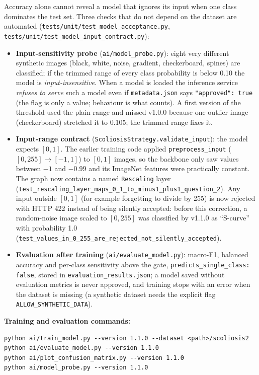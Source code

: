 \documentclass[12pt,a4paper]{article}
\newcommand{\fp}[1]{\nolinkurl{#1}}
\begin{document}
Accuracy alone cannot reveal a model that ignores its input when one class dominates the test set. Three checks that do not depend on the dataset are automated
(\fp{tests/unit/test_model_acceptance.py}, \fp{tests/unit/test_model_input_contract.py}):

\begin{itemize}[leftmargin=*]
    \item \textbf{Input-sensitivity probe} (\fp{ai/model_probe.py}): eight very different synthetic images (black, white, noise, gradient, checkerboard,
          spines) are classified; if the trimmed range of every class probability is below 0.10 the model is \emph{input-insensitive}. When a model is loaded the inference service
          \emph{refuses to serve} such a model even if \fp{metadata.json} says \texttt{"approved": true} (the flag is only a value; behaviour is what counts).
          A first version of the threshold used the plain range and missed v1.0.0 because one outlier image (checkerboard) stretched it to 0.105; the trimmed range fixes it.
    \item \textbf{Input-range contract} (\fp{ScoliosisStrategy.validate_input}): the model expects $[0,1]$. The earlier training code applied \texttt{preprocess\_input}
          ($[0,255]\to[-1,1]$) to $[0,1]$ images, so the backbone only saw values between $-1$ and $-0.99$ and its ImageNet features were practically constant.
          The graph now contains a named \texttt{Rescaling} layer (\fp{test_rescaling_layer_maps_0_1_to_minus1_plus1_question_2}). Any input outside $[0,1]$ (for example forgetting to divide by 255)
          is now rejected with HTTP 422 instead of being silently accepted: before this correction, a random-noise image scaled to $[0,255]$ was classified by v1.1.0 as ``S-curve'' with probability 1.0
          (\fp{test_values_in_0_255_are_rejected_not_silently_accepted}).
    \item \textbf{Evaluation after training} (\fp{ai/evaluate_model.py}): macro-F1, balanced accuracy and per-class sensitivity above the gate,
          \texttt{predicts\_single\_class: false}, stored in \fp{evaluation\_results.json}; a model saved without evaluation metrics is never approved, and training stops with an error
          when the dataset is missing (a synthetic dataset needs the explicit flag \texttt{ALLOW\_SYNTHETIC\_DATA}).
\end{itemize}

\noindent\textbf{Training and evaluation commands:}
\begin{lstlisting}[language={}, numbers=none]
python ai/train_model.py --version 1.1.0 --dataset <path>/scoliosis2
python ai/evaluate_model.py --version 1.1.0
python ai/plot_confusion_matrix.py --version 1.1.0
python ai/model_probe.py --version 1.1.0
\end{lstlisting}
\end{document}
